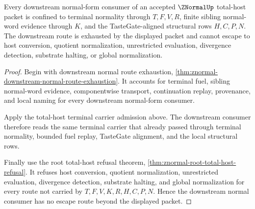 \begin{theorem}
\label{thm:znormal-downstream-normal-consumer-nonescape}
Every downstream normal-form consumer of an accepted $\ZNormalUp$ total-host packet is confined to terminal normality through $T,F,V,R$, finite sibling normal-word evidence through $K$, and the TasteGate-aligned structural rows $H,C,P,N$. The downstream route is exhausted by the displayed packet and cannot escape to host conversion, quotient normalization, unrestricted evaluation, divergence detection, substrate halting, or global normalization.
\end{theorem}
\begin{proof}
Begin with downstream normal route exhaustion, \autoref{thm:znormal-downstream-normal-route-exhaustion}. It accounts for terminal fuel, sibling normal-word evidence, componentwise transport, continuation replay, provenance, and local naming for every downstream normal-form consumer.

Apply the total-host terminal carrier admission above. The downstream consumer therefore reads the same terminal carrier that already passed through terminal normality, bounded fuel replay, TasteGate alignment, and the local structural rows.

Finally use the root total-host refusal theorem, \autoref{thm:znormal-root-total-host-refusal}. It refuses host conversion, quotient normalization, unrestricted evaluation, divergence detection, substrate halting, and global normalization for every route not carried by $T,F,V,K,R,H,C,P,N$. Hence the downstream normal consumer has no escape route beyond the displayed packet.
\end{proof}
